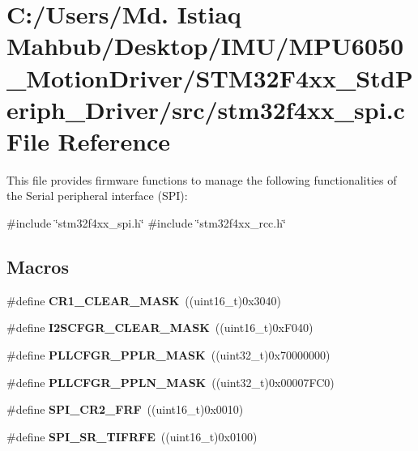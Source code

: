 \section{C\+:/\+Users/\+Md. Istiaq Mahbub/\+Desktop/\+I\+M\+U/\+M\+P\+U6050\+\_\+\+Motion\+Driver/\+S\+T\+M32\+F4xx\+\_\+\+Std\+Periph\+\_\+\+Driver/src/stm32f4xx\+\_\+spi.c File Reference}
\label{stm32f4xx__spi_8c}


This file provides firmware functions to manage the following functionalities of the Serial peripheral interface (S\+PI)\+:  


{\ttfamily \#include \char`\"{}stm32f4xx\+\_\+spi.\+h\char`\"{}}\newline
{\ttfamily \#include \char`\"{}stm32f4xx\+\_\+rcc.\+h\char`\"{}}\newline
\subsection*{Macros}
\begin{DoxyCompactItemize}
\item 
\#define \textbf{ C\+R1\+\_\+\+C\+L\+E\+A\+R\+\_\+\+M\+A\+SK}~((uint16\+\_\+t)0x3040)
\item 
\#define \textbf{ I2\+S\+C\+F\+G\+R\+\_\+\+C\+L\+E\+A\+R\+\_\+\+M\+A\+SK}~((uint16\+\_\+t)0x\+F040)
\item 
\#define \textbf{ P\+L\+L\+C\+F\+G\+R\+\_\+\+P\+P\+L\+R\+\_\+\+M\+A\+SK}~((uint32\+\_\+t)0x70000000)
\item 
\#define \textbf{ P\+L\+L\+C\+F\+G\+R\+\_\+\+P\+P\+L\+N\+\_\+\+M\+A\+SK}~((uint32\+\_\+t)0x00007\+F\+C0)
\item 
\#define \textbf{ S\+P\+I\+\_\+\+C\+R2\+\_\+\+F\+RF}~((uint16\+\_\+t)0x0010)
\item 
\#define \textbf{ S\+P\+I\+\_\+\+S\+R\+\_\+\+T\+I\+F\+R\+FE}~((uint16\+\_\+t)0x0100)
\end{DoxyCompactItemize}
